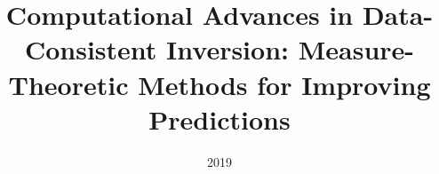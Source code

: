 \documentclass[english,10pt]{ucdenver-dissertation}
\title{Computational Advances in Data-Consistent Inversion: Measure-Theoretic Methods for Improving Predictions}
\date{2019}
\begin{document}


%
%
%
%
%

\renewcommand\bibname{REFERENCES}
\singlespacing

\nocite{*}



\doublespacing

\ucdappendix

%



\end{document}
